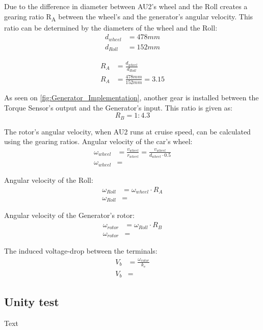 Due to the difference in diameter between AU2's wheel and the Roll creates a gearing ratio R\textsubscript{A} between the wheel's and the generator's angular velocity. This ratio can be determined by the diameters of the wheel and the Roll:
\begin{equation}
	\begin{split}
		d_{wheel} &= 478 mm\\
		d_{Roll} &= 152 mm
	\end{split}
\end{equation}

\begin{equation}
	\begin{split}
		R_A &= \frac{d_{wheel}}{d_{Roll}}\\
		R_A &= \frac{478 mm}{152 mm} = 3.15
	\end{split}
\end{equation}

As seen on \vref{fig:Generator_Implementation}, another gear is installed between the Torque Sensor's output and the Generator's input. This ratio is given as:
\begin{equation}
	R_B = 1:4.3
\end{equation}

The rotor's angular velocity, when AU2 runs at cruise speed, can be calculated using the gearing ratios. Angular velocity of the car's wheel:
\begin{equation}
	\begin{split}
		\omega_{wheel} &= \frac{v_{wheel}}{r_{wheel}} = \frac{v_{wheel}}{d_{wheel} \cdot 0.5}\\
		\omega_{wheel} &=
	\end{split}
\end{equation}

Angular velocity of the Roll:
\begin{equation}
	\begin{split}
		\omega_{Roll} &= \omega_{wheel} \cdot R_A\\
		\omega_{Roll} &=
	\end{split}
\end{equation}

Angular velocity of the Generator's rotor:
\begin{equation}
	\begin{split}
		\omega_{rotor} &= \omega_{Roll} \cdot R_B\\
		\omega_{rotor} &=
	\end{split}
\end{equation}

The induced voltage-drop between the terminals:
\begin{equation}
	\begin{split}
		V_b &= \frac{\omega_{rotor}}{k_e}\\
		V_b &=
	\end{split}
\end{equation}

\subsection{Unity test}
Text